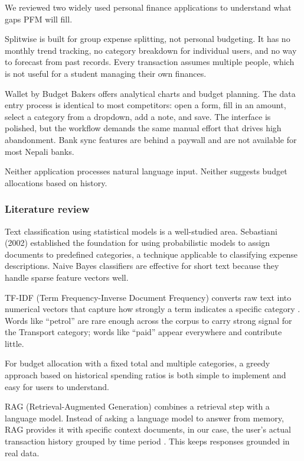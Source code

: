 \documentclass[12pt, a4paper]{article}
\begin{document}
We reviewed two widely used personal finance applications to understand what gaps PFM will fill.

Splitwise is built for group expense splitting, not personal budgeting. It has no monthly trend tracking, no category breakdown for individual users, and no way to forecast from past records. Every transaction assumes multiple people, which is not useful for a student managing their own finances.

Wallet by Budget Bakers offers analytical charts and budget planning. The data entry process is identical to most competitors: open a form, fill in an amount, select a category from a dropdown, add a note, and save. The interface is polished, but the workflow demands the same manual effort that drives high abandonment. Bank sync features are behind a paywall and are not available for most Nepali banks.

Neither application processes natural language input. Neither suggests budget allocations based on history.

\subsubsection{Literature review}

Text classification using statistical models is a well-studied area. Sebastiani (2002) \cite{sebastiani} established the foundation for using probabilistic models to assign documents to predefined categories, a technique applicable to classifying expense descriptions. Naive Bayes classifiers are effective for short text because they handle sparse feature vectors well.

TF-IDF (Term Frequency-Inverse Document Frequency) converts raw text into numerical vectors that capture how strongly a term indicates a specific category \cite{manning}. Words like ``petrol'' are rare enough across the corpus to carry strong signal for the Transport category; words like ``paid'' appear everywhere and contribute little.

For budget allocation with a fixed total and multiple categories, a greedy approach based on historical spending ratios is both simple to implement and easy for users to understand.

RAG (Retrieval-Augmented Generation) combines a retrieval step with a language model. Instead of asking a language model to answer from memory, RAG provides it with specific context documents, in our case, the user's actual transaction history grouped by time period \cite{gemini}. This keeps responses grounded in real data.
\end{document}
